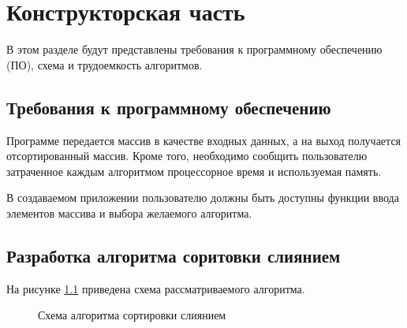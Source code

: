 \chapter{Конструкторская часть}

В этом разделе будут представлены требования к программному обеспечению (ПО), схема и трудоемкость алгоритмов.

\section{Требования к программному обеспечению}

Программе передается массив в качестве входных данных, а на выход получается отсортированный массив. 
Кроме того, необходимо сообщить пользователю затраченное каждым алгоритмом процессорное время и  используемая память.

В создаваемом приложении пользователю должны быть доступны функции ввода элементов массива и выбора желаемого алгоритма. 

\section{Разработка алгоритма соритовки слиянием}

На рисунке \ref{fig:merge_sort} приведена схема рассматриваемого алгоритма.
\FloatBarrier
\begin{figure}[h]
	
	
	\caption{Схема алгоритма сортировки слиянием}
	
	\label{fig:merge_sort}
\end{figure}
\FloatBarrier
\clearpage

